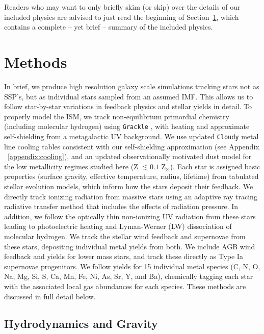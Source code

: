 \documentclass[twocolumn]{aastex61}
\begin{document}
Readers who may want to only briefly skim (or skip) over the details of our included physics are advised to just read the beginning of Section~\ref{sec:methods}, which contains a complete -- yet brief -- summary of the included physics.

\section{Methods}
\label{sec:methods}
In brief, we produce high resolution galaxy scale simulations tracking stars not as SSP's, but as individual stars sampled from an assumed IMF.
This allows us to follow star-by-star variations in feedback physics and stellar yields in detail. To properly model the ISM, we track non-equilibrium primordial chemistry (including molecular hydrogen) using \texttt{Grackle} \citep{GrackleMethod}, with heating and approximate self-shielding from a metagalactic UV background. We use updated \texttt{Cloudy} metal line cooling tables consistent with our self-shielding approximation (see Appendix ~\ref{appendix:cooling}), and an updated observationally motivated dust model for the low metallicity regimes studied here (Z $\lesssim 0.1$ Z$_{\odot}$). Each star is assigned basic properties (surface gravity, effective temperature, radius, lifetime) from tabulated stellar evolution models, which inform how the stars deposit their feedback. We directly track ionizing radiation from massive stars using an adaptive ray tracing radiative transfer method that includes the effects of radiation pressure. In addition, we follow the optically thin non-ionizing UV radiation from these stars leading to photoelectric heating and Lyman-Werner (LW) dissociation of molecular hydrogen. We track the stellar wind feedback and supernovae from these stars, depositing individual metal yields from both. We include AGB wind feedback and yields for lower mass stars, and track these directly as Type Ia supernovae progenitors. We follow yields for 15 individual metal species (C, N, O, Na, Mg, Si, S, Ca, Mn, Fe, Ni, As, Sr, Y, and Ba), chemically tagging each star with the associated local gas abundances for each species. These methods are discussed in full detail below.

\subsection{Hydrodynamics and Gravity}
\label{sec:hydro}
\end{document}
